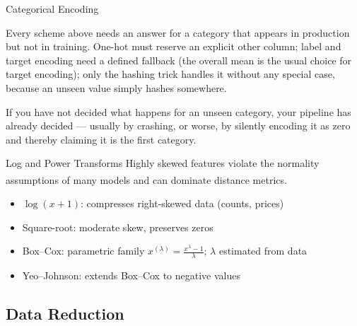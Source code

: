 \begin{v3topic}{Categorical Encoding}
\begin{cautionbox}
Every scheme above needs an answer for a category that appears in production
but not in training. One-hot must reserve an explicit \textsf{other} column;
label and target encoding need a defined fallback (the overall mean is the
usual choice for target encoding); only the hashing trick handles it without
any special case, because an unseen value simply hashes somewhere.

If you have not decided what happens for an unseen category, your pipeline has
already decided --- usually by crashing, or worse, by silently encoding it as
zero and thereby claiming it is the first category.
\end{cautionbox}

\end{v3topic}
\begin{v3topic}{Log and Power Transforms}
    Highly skewed features violate the normality assumptions of many models and can dominate distance metrics\textsuperscript{\cite{hanDataMiningConcepts2012}}.
\visualseparator
    \begin{itemize}
        \item $\log(x + 1)$: compresses right-skewed data (counts, prices)
        \item Square-root: moderate skew, preserves zeros
        \item Box--Cox: parametric family $x^{(\lambda)} = \frac{x^\lambda - 1}{\lambda}$; $\lambda$ estimated from data
        \item Yeo--Johnson: extends Box--Cox to negative values
    \end{itemize}
\end{v3topic}

\subsection{Data Reduction}

